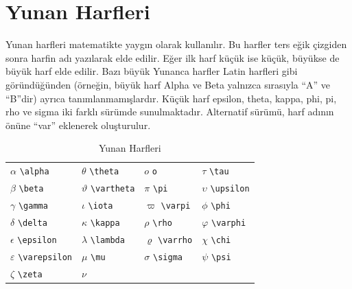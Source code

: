 \documentclass[
  letterpaper,
  DIV=11,
  numbers=noendperiod]{scrreprt}
\begin{document}
\hypertarget{yunan-harfleri}{%
\section{Yunan Harfleri}\label{yunan-harfleri}}

Yunan harfleri matematikte yaygın olarak kullanılır. Bu harfler ters
eğik çizgiden sonra harfin adı yazılarak elde edilir. Eğer ilk harf
küçük ise küçük, büyükse de büyük harf elde edilir. Bazı büyük Yunanca
harfler Latin harfleri gibi göründüğünden (örneğin, büyük harf Alpha ve
Beta yalnızca sırasıyla ``A'' ve ``B''dir) ayrıca tanımlanmamışlardır.
Küçük harf epsilon, theta, kappa, phi, pi, rho ve sigma iki farklı
sürümde sunulmaktadır. Alternatif sürümü, harf adının önüne ``var''
eklenerek oluşturulur.

\hypertarget{tbl-yunan}{}
\begin{longtable}[]{@{}
  >{\raggedright\arraybackslash}p{}
  >{\raggedright\arraybackslash}p{}
  >{\raggedright\arraybackslash}p{}
  >{\raggedright\arraybackslash}p{}@{}}
\caption{\label{tbl-yunan}Yunan Harfleri}\tabularnewline
\toprule()
\endhead
\(\alpha\) \texttt{\textbackslash{}alpha} & \(\theta\)
\texttt{\textbackslash{}theta} & \(o\) \texttt{o} & \(\tau\)
\texttt{\textbackslash{}tau} \\
\(\beta\) \texttt{\textbackslash{}beta} & \(\vartheta\)
\texttt{\textbackslash{}vartheta} & \(\pi\) \texttt{\textbackslash{}pi}
& \(\upsilon\) \texttt{\textbackslash{}upsilon} \\
\(\gamma\) \texttt{\textbackslash{}gamma} & \(\iota\)
\texttt{\textbackslash{}iota} & \(\varpi\)
\texttt{\textbackslash{}varpi} & \(\phi\)
\texttt{\textbackslash{}phi} \\
\(\delta\) \texttt{\textbackslash{}delta} & \(\kappa\)
\texttt{\textbackslash{}kappa} & \(\rho\) \texttt{\textbackslash{}rho} &
\(\varphi\) \texttt{\textbackslash{}varphi} \\
\(\epsilon\) \texttt{\textbackslash{}epsilon} & \(\lambda\)
\texttt{\textbackslash{}lambda} & \(\varrho\)
\texttt{\textbackslash{}varrho} & \(\chi\)
\texttt{\textbackslash{}chi} \\
\(\varepsilon\) \texttt{\textbackslash{}varepsilon} & \(\mu\)
\texttt{\textbackslash{}mu} & \(\sigma\) \texttt{\textbackslash{}sigma}
& \(\psi\) \texttt{\textbackslash{}psi} \\
\(\zeta\) \texttt{\textbackslash{}zeta} & \(\nu\)

\end{longtable}
\end{document}
